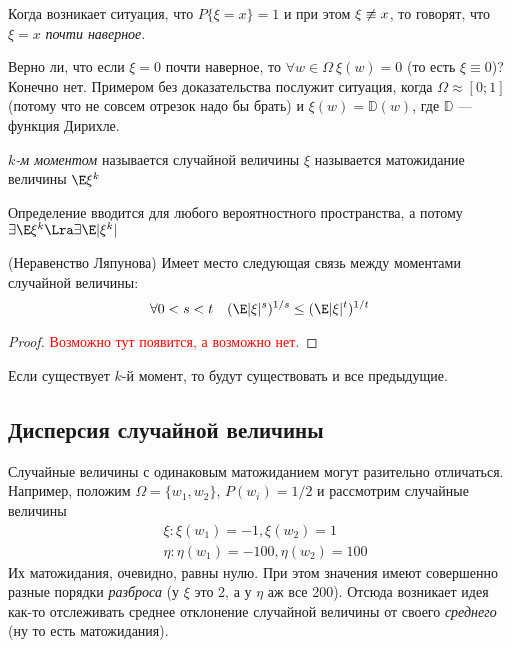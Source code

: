 \begin{definition}
	Когда возникает ситуация, что $P\{\xi = x\} = 1$ и при этом $\xi \centernot\equiv x$, то говорят, что $\xi = x$ \textit{почти наверное}.
\end{definition}

\begin{note}
	Верно ли, что если $\xi = 0$ почти наверное, то $\forall w \in \Omega\ \xi(w) = 0$ (то есть $\xi \equiv 0$)? Конечно нет. Примером без доказательства послужит ситуация, когда $\Omega \approx [0; 1]$ (потому что не совсем отрезок надо бы брать) и $\xi(w) = \mathbb{D}(w)$, где $\mathbb{D}$ --- функция Дирихле.
\end{note}

\begin{definition}
	\textit{$k$-м моментом} называется случайной величины $\xi$ называется матожидание величины $\E\xi^k$
\end{definition}

\begin{note}
	Определение вводится для любого вероятностного пространства, а потому $\exists \E\xi^k \Lra \exists \E|\xi^k|$
\end{note}

\begin{theorem} (Неравенство Ляпунова)
	Имеет место следующая связь между моментами случайной величины:
	\[
		\forall 0 < s < t \quad (\E|\xi|^s)^{1/s} \le (\E|\xi|^t)^{1/t}
	\]
\end{theorem}

\begin{proof}
	\textcolor{red}{Возможно тут появится, а возможно нет.}
\end{proof}

\begin{corollary}
	Если существует $k$-й момент, то будут существовать и все предыдущие.
\end{corollary}

\subsection{Дисперсия случайной величины}

\begin{note}
	Случайные величины с одинаковым матожиданием могут разительно отличаться. Например, положим $\Omega = \{w_1, w_2\}$, $P(w_i) = 1/2$ и рассмотрим случайные величины
	\begin{align*}
		&{\xi \colon \xi(w_1) = -1, \xi(w_2) = 1}
		\\
		&{\eta \colon \eta(w_1) = -100, \eta(w_2) = 100}
	\end{align*}
	Их матожидания, очевидно, равны нулю. При этом значения имеют совершенно разные порядки \textit{разброса} (у $\xi$ это 2, а у $\eta$ аж все 200). Отсюда возникает идея как-то отслеживать среднее отклонение случайной величины от своего \textit{среднего} (ну то есть матожидания).
\end{note}


